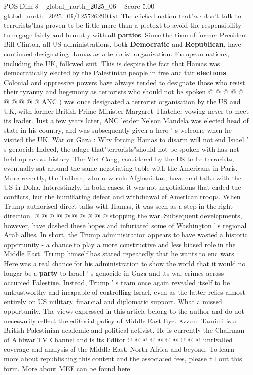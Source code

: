 \begin{textsample}{POS Dim 8 – global\_north\_2025\_06 – Score 5.00 – global\_north\_2025\_06/125726290.txt}
The cliched notion that"we don't talk to terrorists"has proven to be little more than a pretext to avoid the responsibility to engage fairly and honestly with all \textbf{parties}.
Since the time of former President Bill Clinton, all US administrations, both \textbf{Democratic} and \textbf{Republican}, have continued designating Hamas as a terrorist organisation.
European nations, including the UK, followed suit.
This is despite the fact that Hamas was democratically elected by the Palestinian people in free and fair \textbf{elections}.
Colonial and oppressive powers have always tended to designate those who resist their tyranny and hegemony as terrorists who should not be spoken @ @ @ @ @ @ @ @ @ @ ANC ) was once designated a terrorist organisation by the US and UK, with former British Prime Minister Margaret Thatcher vowing never to meet its leader.
Just a few years later, ANC leader Nelson Mandela was elected head of state in his country, and was subsequently given a hero ' s welcome when he visited the UK.
War on Gaza : Why forcing Hamas to disarm will not end Israel ' s genocide Indeed, the adage that"terrorists"should not be spoken with has not held up across history.
The Viet Cong, considered by the US to be terrorists, eventually sat around the same negotiating table with the Americans in Paris.
More recently, the Taliban, who now rule Afghanistan, have held talks with the US in Doha.
Interestingly, in both cases, it was not negotiations that ended the conflicts, but the humiliating defeat and withdrawal of American troops.
When Trump authorised direct talks with Hamas, it was seen as a step in the right direction. @ @ @ @ @ @ @ @ @ @ stopping the war.
Subsequent developments, however, have dashed these hopes and infuriated some of Washington ' s regional Arab allies.
In short, the Trump administration appears to have wasted a historic opportunity - a chance to play a more constructive and less biased role in the Middle East.
Trump himself has stated repeatedly that he wants to end wars.
Here was a real chance for his administration to show the world that it would no longer be a \textbf{party} to Israel ' s genocide in Gaza and its war crimes across occupied Palestine.
Instead, Trump ' s team once again revealed itself to be untrustworthy and incapable of controlling Israel, even as the latter relies almost entirely on US military, financial and diplomatic support.
What a missed opportunity.
The views expressed in this article belong to the author and do not necessarily reflect the editorial policy of Middle East Eye.
Azzam Tamimi is a British Palestinian academic and political activist.
He is currently the Chairman of Alhiwar TV Channel and is its Editor @ @ @ @ @ @ @ @ @ @ unrivalled coverage and analysis of the Middle East, North Africa and beyond.
To learn more about republishing this content and the associated fees, please fill out this form.
More about MEE can be found here.

\end{textsample}
